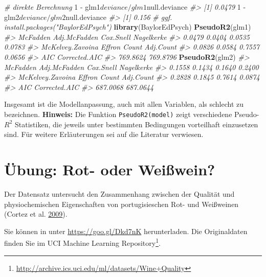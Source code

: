 \documentclass[12pt,]{book}
\makeatletter
\newenvironment{Shaded}{\begin{snugshade}}{\end{snugshade}}
\newcommand{\KeywordTok}[1]{\textcolor[rgb]{0.13,0.29,0.53}{\textbf{{#1}}}}
\newcommand{\DecValTok}[1]{\textcolor[rgb]{0.00,0.00,0.81}{{#1}}}
\newcommand{\StringTok}[1]{\textcolor[rgb]{0.31,0.60,0.02}{{#1}}}
\newcommand{\CommentTok}[1]{\textcolor[rgb]{0.56,0.35,0.01}{\textit{{#1}}}}
\newcommand{\NormalTok}[1]{{#1}}
\newenvironment{kframe}{%
\medskip{}
\setlength{\fboxsep}{.8em}
 \def\at@end@of@kframe{}%
 \ifinner\ifhmode%
  \def\at@end@of@kframe{\end{minipage}}%
  \begin{minipage}{\columnwidth}%
 \fi\fi%
 \def\FrameCommand##1{\hskip\@totalleftmargin \hskip-\fboxsep
 \colorbox{shadecolor}{##1}\hskip-\fboxsep
     \hskip-\linewidth \hskip-\@totalleftmargin \hskip\columnwidth}%
 \MakeFramed {\advance\hsize-\width
   \@totalleftmargin\z@ \linewidth\hsize
   \@setminipage}}%
 {\par\unskip\endMakeFramed%
 \at@end@of@kframe}
\renewenvironment{Shaded}{\begin{kframe}}{\end{kframe}}
\makeatother
\begin{document}
\begin{Shaded}
\begin{Highlighting}[]
\CommentTok{# direkte Berechnung}
\DecValTok{1} \NormalTok{-}\StringTok{ }\NormalTok{glm1$deviance/glm1$null.deviance}
\CommentTok{#> [1] 0.0479}
\DecValTok{1} \NormalTok{-}\StringTok{ }\NormalTok{glm2$deviance/glm2$null.deviance}
\CommentTok{#> [1] 0.156}
\CommentTok{# ggf. install.packages("BaylorEdPsych")}
\KeywordTok{library}\NormalTok{(BaylorEdPsych)}
\KeywordTok{PseudoR2}\NormalTok{(glm1)}
\CommentTok{#>         McFadden     Adj.McFadden        Cox.Snell       Nagelkerke }
\CommentTok{#>           0.0479           0.0404           0.0535           0.0783 }
\CommentTok{#> McKelvey.Zavoina           Effron            Count        Adj.Count }
\CommentTok{#>           0.0826           0.0584           0.7557           0.0656 }
\CommentTok{#>              AIC    Corrected.AIC }
\CommentTok{#>         769.8624         769.8796}
\KeywordTok{PseudoR2}\NormalTok{(glm2)}
\CommentTok{#>         McFadden     Adj.McFadden        Cox.Snell       Nagelkerke }
\CommentTok{#>           0.1558           0.1434           0.1640           0.2400 }
\CommentTok{#> McKelvey.Zavoina           Effron            Count        Adj.Count }
\CommentTok{#>           0.2828           0.1845           0.7614           0.0874 }
\CommentTok{#>              AIC    Corrected.AIC }
\CommentTok{#>         687.0068         687.0644}
\end{Highlighting}
\end{Shaded}

Insgesamt ist die Modellanpassung, auch mit allen Variablen, als
schlecht zu bezeichnen. \textbf{Hinweis:} Die Funktion
\texttt{PseudoR2(model)} zeigt verschiedene Pseudo-\(R^2\) Statistiken,
die jeweils unter bestimmten Bedingungen vorteilhaft einzusetzen sind.
Für weitere Erläuterungen sei auf die Literatur verwiesen.

\section{Übung: Rot- oder Weißwein?}\label{ubung-rot--oder-weiwein}

Der Datensatz untersucht den Zusammenhang zwischen der Qualität und
physiochemischen Eigenschaften von portugisieschen Rot- und Weißweinen
(Cortez et al. \protect\hyperlink{ref-cortez2009modeling}{2009}).

Sie können in unter \url{https://goo.gl/Dkd7nK} herunterladen. Die
Originaldaten finden Sie im UCI Machine Learning Repository\footnote{\url{http://archive.ics.uci.edu/ml/datasets/Wine+Quality}}.
\end{document}
